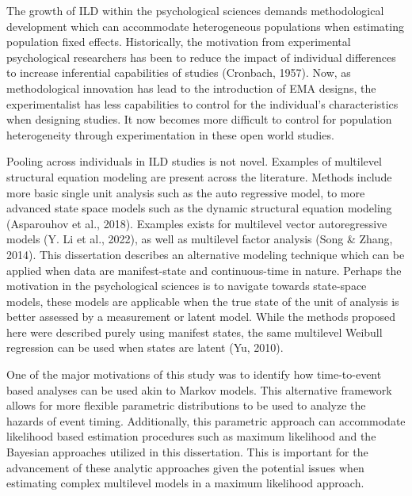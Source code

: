 \documentclass[12pt]{./styles/outhesis}
\begin{document}
The growth of ILD within the psychological sciences demands
methodological development which can accommodate heterogeneous
populations when estimating population fixed effects. Historically, the
motivation from experimental psychological researchers has been to
reduce the impact of individual differences to increase inferential
capabilities of studies (Cronbach, 1957). Now, as methodological
innovation has lead to the introduction of EMA designs, the
experimentalist has less capabilities to control for the individual's
characteristics when designing studies. It now becomes more difficult to
control for population heterogeneity through experimentation in these
open world studies.

Pooling across individuals in ILD studies is not novel. Examples of
multilevel structural equation modeling are present across the
literature. Methods include more basic single unit analysis such as the
auto regressive model, to more advanced state space models such as the
dynamic structural equation modeling (Asparouhov et al., 2018). Examples
exists for multilevel vector autoregressive models (Y. Li et al., 2022), as well as multilevel
factor analysis (Song \& Zhang, 2014). This dissertation describes an
alternative modeling technique which can be applied when data are
manifest-state and continuous-time in nature. Perhaps the motivation in
the psychological sciences is to navigate towards state-space models,
these models are applicable when the true state of the unit of analysis
is better assessed by a measurement or latent model. While the methods
proposed here were described purely using manifest states, the same
multilevel Weibull regression can be used when states are latent (Yu,
2010).

One of the major motivations of this study was to identify how
time-to-event based analyses can be used akin to Markov models. This
alternative framework allows for more flexible parametric distributions
to be used to analyze the hazards of event timing. Additionally, this
parametric approach can accommodate likelihood based estimation
procedures such as maximum likelihood and the Bayesian approaches
utilized in this dissertation. This is important for the advancement of
these analytic approaches given the potential issues when estimating
complex multilevel models in a maximum likelihood approach.
\end{document}
